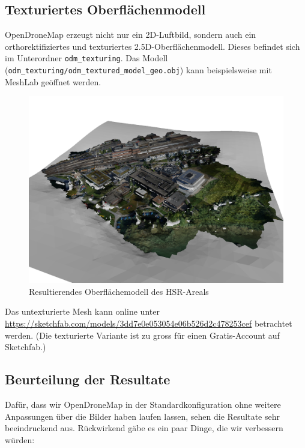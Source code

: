 \subsection{Texturiertes Oberflächenmodell}

OpenDroneMap erzeugt nicht nur ein 2D-Luftbild, sondern auch ein
orthorektifiziertes und texturiertes 2.5D-Oberflächenmodell. Dieses befindet
sich im Unterordner \texttt{odm\_texturing}. Das Modell
(\texttt{odm\_tex\-tu\-ring/\-odm\_textured\_model\_geo.obj}) kann
beispielsweise mit MeshLab geöffnet werden.

\begin{figure}[H]
	\centering
	\includegraphics[width=\textwidth]{images/odm_mesh}
	\caption{Resultierendes Oberflächemodell des HSR-Areals}
	\label{img:odm_mesh}
\end{figure}

\noindent Das untexturierte Mesh kann online unter
\url{https://sketchfab.com/models/3dd7e0e053054e06b526d2c478253cef} betrachtet
werden. (Die texturierte Variante ist zu gross für einen Gratis-Account auf
Sketchfab.)

\subsection{Beurteilung der Resultate}

Dafür, dass wir OpenDroneMap in der Standardkonfiguration ohne weitere
Anpassungen über die Bilder haben laufen lassen, sehen die Resultate sehr
beeindruckend aus. Rückwirkend gäbe es ein paar Dinge, die wir verbessern
würden:

